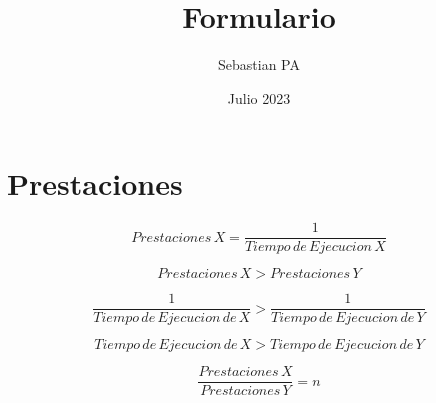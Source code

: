 \documentclass[12pt]{article}
\title{Formulario}
\author{Sebastian PA}
\date{Julio 2023}
\begin{document}
\maketitle

\section*{Prestaciones}
\begin{equation}
    Prestaciones\hspace{2pt}X = \frac{1}{Tiempo\hspace{2pt}de\hspace{2pt}Ejecucion\hspace{2pt}X}
\end{equation}  

\begin{equation}
    Prestaciones\hspace{2pt}X > Prestaciones\hspace{2pt}Y
\end{equation}

\begin{equation}
    \frac{1}{Tiempo\hspace{2pt}de\hspace{2pt}Ejecucion\hspace{2pt}de\hspace{2pt}X} > \frac{1}{Tiempo\hspace{2pt}de\hspace{2pt}Ejecucion\hspace{2pt}de\hspace{2pt}Y}
\end{equation}

\begin{equation}
    Tiempo\hspace{2pt}de\hspace{2pt}Ejecucion\hspace{2pt}de\hspace{2pt}X > Tiempo\hspace{2pt}de\hspace{2pt}Ejecucion\hspace{2pt}de\hspace{2pt}Y
\end{equation}

\begin{equation}
    \frac{Prestaciones\hspace{2pt}X}{Prestaciones\hspace{2pt}Y} = n
\end{equation}
\end{document}
